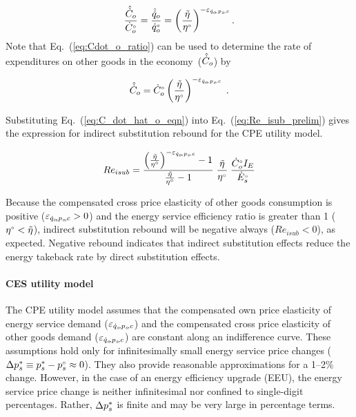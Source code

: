 \begin{equation} \label{eq:Cdot_o_ratio}
  \frac{\hat{\dot{C}}_o}{{}{\dot{C}}^{\scriptscriptstyle \circ}_o}
      = \frac{\hat{\dot{q}}_o}{{}{\dot{q}}^{\scriptscriptstyle \circ}_o}
      = \left( \frac{\tilde{\eta}}{{}{\eta}^{\scriptscriptstyle \circ}} \right)^{-\varepsilon_{\dot{q}_o\!,p_s\!,c}} .
\end{equation}
%
Note that Eq.~(\ref{eq:Cdot_o_ratio})
can be used to determine the rate of expenditures
on other goods in the economy~($\hat{\dot{C}}_o$) by

\begin{equation} \label{eq:C_dot_hat_o_eqn}
  \hat{\dot{C}}_o = {}{\dot{C}}^{\scriptscriptstyle \circ}_o \left( \frac{\tilde{\eta}}{{}{\eta}^{\scriptscriptstyle \circ}} \right)^{-\varepsilon_{\dot{q}_o\!,p_s\!,c}} \; .
\end{equation}

Substituting Eq.~(\ref{eq:C_dot_hat_o_eqn}) into Eq.~(\ref{eq:Re_isub_prelim})
gives the expression for 
indirect substitution rebound for the CPE utility model.

\begin{equation}
  Re_{isub} = \frac{{\left( \frac{\tilde{\eta}}{{}{\eta}^{\scriptscriptstyle \circ}} \right)} ^{-\varepsilon_{\dot{q}_o\!,p_s\!,c}} - 1}{\frac{\tilde{\eta}}{{}{\eta}^{\scriptscriptstyle \circ}} - 1} \; \frac{\tilde{\eta}}{{}{\eta}^{\scriptscriptstyle \circ}} \; \frac{{}{\dot{C}}^{\scriptscriptstyle \circ}_o I_E}{{}{\dot{E}}^{\scriptscriptstyle \circ}_s}{}
\end{equation}

Because the compensated cross price elasticity of other goods consumption is positive ($\varepsilon_{\dot{q}_o\!,p_s\!,c} > 0$) and
the energy service efficiency ratio is greater than 1
(${}{\eta}^{\scriptscriptstyle \circ} < \tilde{\eta}$),
indirect substitution rebound will be negative always ($Re_{isub} < 0$),
as expected.
Negative rebound indicates that indirect substitution effects 
reduce the energy takeback rate by direct substitution effects.


\paragraph{CES utility model}
\label{sec:Resub_exact_method}

The CPE utility model assumes that 
the compensated own price elasticity of energy service demand ($\varepsilon_{\dot{q}_s\!,p_s\!,c}$) and
the compensated cross price elasticity of other goods demand ($\varepsilon_{\dot{q}_o\!,p_s\!,c}$)
are constant along an indifference curve.
These assumptions hold only 
for infinitesimally small energy service price changes
($\Delta {p}^*_s \equiv {p}^*_s - {}{p}^{\scriptscriptstyle \circ}_s \approx 0$).
They also provide reasonable approximations for a 1--2\% change.
However, in the case of an energy efficiency upgrade (EEU), 
the energy service price change is neither infinitesimal nor confined
to single-digit percentages.
Rather, 
$\Delta {p}^*_s$ is finite and may be very large in percentage terms.

